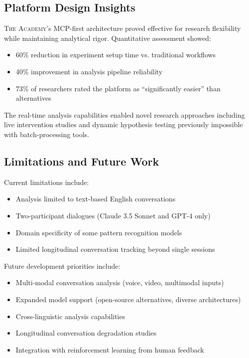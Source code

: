 \documentclass{article}
\newcommand{\theacademy}{\textsc{The Academy}}
\newcommand{\mcp}{\textsc{MCP}}
\begin{document}
\subsection{Platform Design Insights}

\theacademy{}'s \mcp{}-first architecture proved effective for research flexibility while maintaining analytical rigor. Quantitative assessment showed:

\begin{itemize}
    \item 60\% reduction in experiment setup time vs. traditional workflows
    \item 40\% improvement in analysis pipeline reliability
    \item 73\% of researchers rated the platform as ``significantly easier'' than alternatives
\end{itemize}

The real-time analysis capabilities enabled novel research approaches including live intervention studies and dynamic hypothesis testing previously impossible with batch-processing tools.

\subsection{Limitations and Future Work}

Current limitations include:

\begin{itemize}
    \item Analysis limited to text-based English conversations
    \item Two-participant dialogues (Claude 3.5 Sonnet and GPT-4 only)
    \item Domain specificity of some pattern recognition models
    \item Limited longitudinal conversation tracking beyond single sessions
\end{itemize}

Future development priorities include:
\begin{itemize}
    \item Multi-modal conversation analysis (voice, video, multimodal inputs)
    \item Expanded model support (open-source alternatives, diverse architectures)
    \item Cross-linguistic analysis capabilities
    \item Longitudinal conversation degradation studies
    \item Integration with reinforcement learning from human feedback
\end{itemize}
\end{document}
